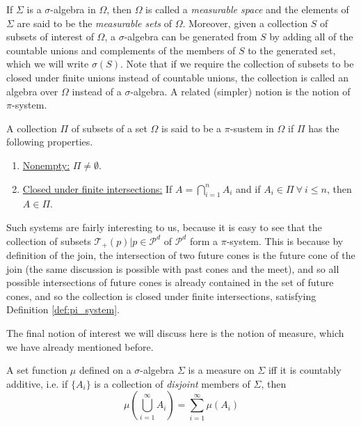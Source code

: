 If $\Sigma$ is a $\sigma$-algebra in $\Omega$, then $\Omega$ is called a \textit{measurable space} and the elements of $\Sigma$ are said to be the \textit{measurable sets} of $\Omega$. Moreover, given a collection $S$ of subsets of interest of $\Omega$, a $\sigma$-algebra can be generated from $S$ by adding all of the countable unions and complements of the members of $S$ to the generated set, which we will write $\sigma(S)$. Note that if we require the collection of subsets to be closed under finite unions instead of countable unions, the collection is called an algebra over $\Omega$ instead of a $\sigma$-algebra. A related (simpler) notion is the notion of $\pi$-system.

\begin{appendix_definition}[$\pi$-system] \label{def:pi_system}
    A collection $\Pi$ of subsets of a set $\Omega$ is said to be a $\pi$-sustem in $\Omega$ if $\Pi$ has the following properties.
    \begin{enumerate}
        \item \underline{Nonempty:} $\Pi \neq \emptyset$.
        \item \underline{Closed under finite intersections:} If $A = \bigcap\limits_{i = 1}^n A_i$ and if $A_i \in \Pi \: \forall \: i \leq n$, then $A \in \Pi$.
    \end{enumerate}
\end{appendix_definition}

Such systems are fairly interesting to us, because it is easy to see that the collection of subsets ${\mathcal{T}_+(p) | p \in \mathcal{P}^d}$ of $\mathcal{P}^d$ form a $\pi$-system. This is because by definition of the join, the intersection of two future cones is the future cone of the join (the same discussion is possible with past cones and the meet), and so all possible intersections of future cones is already contained in the set of future cones, and so the collection is closed under finite intersections, satisfying Definition \ref{def:pi_system}.

The final notion of interest we will discuss here is the notion of measure, which we have already mentioned before.

\begin{appendix_definition}[Measure]
    A set function $\mu$ defined on a $\sigma$-algebra $\Sigma$ is a measure on $\Sigma$ iff it is countably additive, i.e. if $\{A_i\}$ is a collection of \textit{disjoint} members of $\Sigma$, then
    \begin{equation}
        \mu\left(\bigcup\limits_{i = 1}^\infty A_i\right) = \sum_{i = 1}^{\infty} \mu(A_i)
    \end{equation}
\end{appendix_definition}

